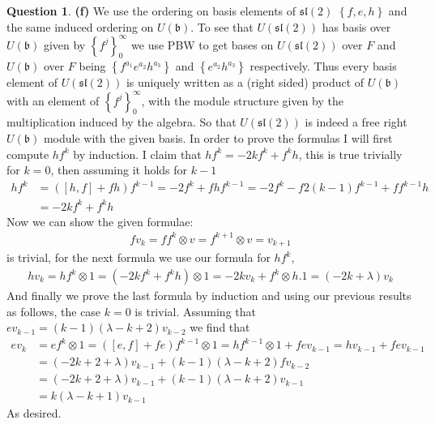 \documentclass[10.5pt]{article}
\theoremstyle{definition}
\newtheorem{pb}{Question}
\numberwithin{example}{subsection}
\numberwithin{proposition}{subsection}
\newcommand{\set}[1]{\left\{#1\right\}}
\begin{document}
\begin{pb}
        \textbf{(f)} We use the ordering on basis elements of \(\mathfrak{sl}(2)\) \(\set{f,e,h}\) and the same induced ordering on \(U(\mathfrak{b})\). To see that \(U(\mathfrak{sl}(2))\) has basis over \(U(\mathfrak{b})\) given by \(\set{f^j}_0^\infty\) we use PBW to get bases on \(U(\mathfrak{sl}(2))\) over \(F\) and \(U(\mathfrak{b})\) over \(F\) being \(\set{f^{a_1}e^{a_2}h^{a_3}}\) and \(\set{e^{a_2}h^{a_3}}\) respectively. Thus every basis element of \(U(\mathfrak{sl}(2))\) is uniquely written as a (right sided) product of \(U(\mathfrak{b})\) with an element of \(\set{f^j}_0^\infty\), with the module structure given by the multiplication induced by the algebra. So that \(U(\mathfrak{sl}(2))\) is indeed a free right \(U(\mathfrak{b})\) module with the given basis. In order to prove the formulas I will first compute \(hf^k\) by induction. I claim that \(hf^k = -2kf^k + f^k h\), this is true trivially for \(k = 0\), then assuming it holds for \(k-1\)
        \begin{align}
            hf^k &= ([h,f] + fh)f^{k-1} = -2f^k + fhf^{k-1} = -2f^k - f2(k-1)f^{k-1} + ff^{k-1}h \\
            &=-2kf^k + f^k h
        \end{align}
        Now we can show the given formulae:
        \begin{align}
            fv_k = ff^k \otimes v = f^{k+1}\otimes v = v_{k+1}
        \end{align}
        is trivial, for the next formula we use our formula for \(hf^k\),
        \begin{align}
            hv_k = hf^k \otimes 1 = (-2kf^k + f^kh) \otimes 1 = -2kv_k + f^k \otimes h.1 = (-2k + \lambda)v_k
        \end{align}
        And finally we prove the last formula by induction and using our previous results as follows, the case \(k = 0\) is trivial. Assuming that \(ev_{k-1} = (k-1)(\lambda-k+2)v_{k-2}\) we find that
        \begin{align}
            ev_k &= ef^k \otimes 1 = ([e,f] + fe)f^{k-1} \otimes 1 = hf^{k-1} \otimes 1 + fev_{k-1} = hv_{k-1} + fev_{k-1} \\
            &= (-2k + 2 + \lambda)v_{k-1} + (k-1)(\lambda-k+2)f v_{k-2} \\
            &= (-2k + 2 + \lambda)v_{k-1} + (k-1)(\lambda-k+2)v_{k-1} \\
            &= k(\lambda - k + 1)v_{k-1}
        \end{align}
        As desired.


\end{pb}
\end{document}
